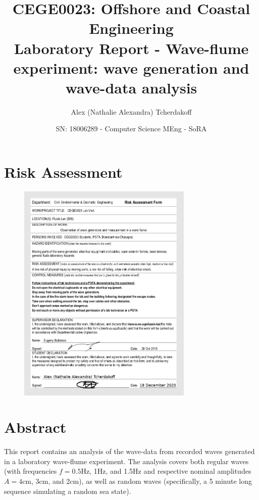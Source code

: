 \documentclass{article}
\title{CEGE0023: Offshore and Coastal Engineering\\
	Laboratory Report - Wave-flume experiment: wave generation and wave-data analysis}
\author{Alex (Nathalie Alexandra) Tcherdakoff}
\date{SN: 18006289 - Computer Science MEng - SoRA}
\begin{document}
	\maketitle
	\section*{Risk Assessment}
	\begin{figure}[H]
		\centering
		\includegraphics[width=0.745\textwidth]{../graphs/RiskAssessment.png}
		\label{riskassessment}
	\end{figure}
	\section{Abstract}
	This report contains an analysis of the wave-data from recorded waves generated in a laboratory wave-flume experiment. The analysis covers both regular waves (with frequencies $f = 0.5$Hz, 1Hz, and 1.5Hz and respective nominal amplitudes $A = 4$cm, 3cm, and 2cm), as well as random waves (specifically, a 5 minute long sequence simulating a random sea state).
\end{document}
